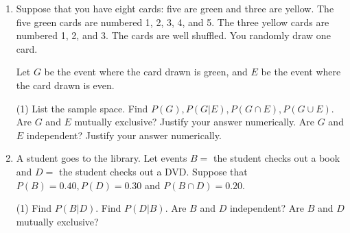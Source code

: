\begin{enumerate}
\item Suppose that you have eight cards: five are green and three are yellow. The five green cards are numbered 1, 2, 3, 4, and 5. The three yellow cards are numbered 1, 2, and 3. The cards are well shuffled. You randomly draw one card.
\medskip

Let $G$ be the event where the card drawn is green, and $E$ be the event where the card drawn is even.
\begin{tasks}[after-skip = 40pt, after-item-skip=25pt](1)
\task List the sample space.
\task Find $P(G), P(G|E), P(G \cap E), P(G \cup E)$.
\task Are $G$ and $E$ mutually exclusive? Justify your answer numerically.
\task Are $G$ and $E$ independent? Justify your answer numerically.
\end{tasks}

\item A student goes to the library. Let events $B =$ the student checks out a book and $D =$ the student checks out a DVD. Suppose that $P(B) = 0.40, P(D) = 0.30$ and $P(B \cap D) = 0.20$.
\begin{tasks}[after-skip = 40pt, after-item-skip=25pt](1)
\task Find $P(B|D)$.
\task Find $P(D|B)$.
\task Are $B$ and $D$ independent?
\task Are $B$ and $D$ mutually exclusive?
\end{tasks}

\end{enumerate}